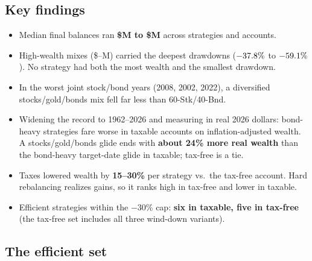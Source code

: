 \documentclass[9pt]{extarticle}
\begin{document}
\subsection*{Key findings}
\begin{itemize}
\item Median final balances ran \textbf{\$\WealthRangeLo M to \$\WealthRangeHi M} across strategies and accounts.
\item High-wealth mixes (\$\EquityHeavyLo--\EquityHeavyHi M) carried the deepest drawdowns ($-37.8\%$ to $-59.1\%$). No strategy had both the most wealth and the smallest drawdown.
\item In the worst joint stock/bond years (2008, 2002, 2022), a diversified stocks/gold/bonds mix fell far less than 60-Stk/40-Bnd.
\item Widening the record to 1962--2026 and measuring in real 2026 dollars: bond-heavy strategies fare worse in taxable accounts on inflation-adjusted wealth. A stocks/gold/bonds glide ends with \textbf{about 24\% more real wealth} than the bond-heavy target-date glide in taxable; tax-free is a tie.
\item Taxes lowered wealth by \textbf{15--30\%} per strategy vs.\ the tax-free account. Hard rebalancing realizes gains, so it ranks high in tax-free and lower in taxable.
\item Efficient strategies within the $-30\%$ cap: \textbf{six in taxable, five in tax-free} (the tax-free set includes all three wind-down variants).
\end{itemize}

\subsection*{The efficient set}
\end{document}
